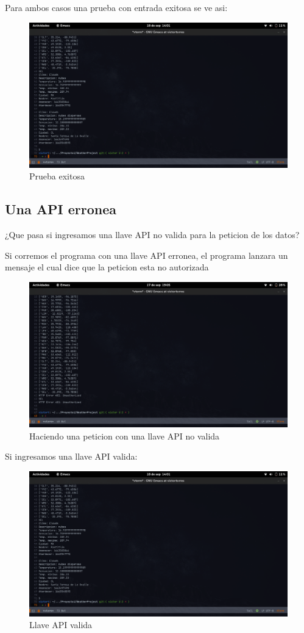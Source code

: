 \documentclass[12pt]{article}
\begin{document}
Para ambos casos una prueba con entrada exitosa se ve asi:
\begin{figure}[ht]
  \centering
  \includegraphics[scale=0.3]{figures/pruebaBuena}
  \caption{Prueba exitosa}
\end{figure}

\subsection{Una API erronea}
¿Que pasa si ingresamos una llave API no valida para la peticion de los datos?

Si corremos el programa con una llave API erronea, el programa lanzara un mensaje el cual dice que la peticion esta no autorizada
\begin{figure}[ht]
  \centering
  \includegraphics[scale=0.3]{figures/apiMal}
  \caption{Haciendo una peticion con una llave API no valida}
\end{figure}

Si ingresamos una llave API valida:
\begin{figure}[ht]
  \centering
  \includegraphics[scale=0.3]{figures/pruebaBuena}
  \caption{Llave API valida}
\end{figure}
\end{document}
